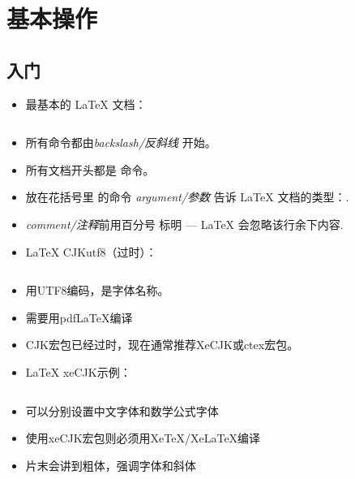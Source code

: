 \documentclass{beamer}
\begin{document}
\section{基本操作}

\subsection{入门}
\begin{frame}[fragile]{\insertsubsection}
\begin{itemize}
\item 最基本的 \LaTeX{} 文档：
\inputminted[frame=single]{latex}{basics.tex}
\item 所有命令都由\emph{backslash/反斜线} \keystrokebftt{\bs}开始。
\item 所有文档开头都是 命令。
\item 放在花括号里 \keystrokebftt{\{} \keystrokebftt{\}} 的命令 \emph{argument/参数} 告诉 \LaTeX{} 文档的类型：.
\item \emph{comment/注释}前用百分号 \keystrokebftt{\%} 标明 --- \LaTeX{}
会忽略该行余下内容.
\end{itemize}
\end{frame}

\begin{frame}[fragile]{\insertsubsection}
\begin{itemize}
\item \LaTeX{} CJKutf8（过时）：
\inputminted[frame=single]{latex}{basics-zh-cn.tex}
\item {}用UTF8编码，是字体名称。
\item 需要用pdfLaTeX编译
\item CJK宏包已经过时，现在通常推荐XeCJK或ctex宏包。
\end{itemize} 
\end{frame}

\begin{frame}[fragile]{\insertsubsection}
\begin{itemize}
\item \LaTeX{} xeCJK示例：
\inputminted[frame=single]{latex}{basics-zh-cn1.tex}
\item 可以分别设置中文字体和数学公式字体
\item 使用xeCJK宏包则必须用XeTeX/XeLaTeX编译
\item 片末会讲到粗体，强调字体和斜体
\end{itemize}
\end{frame}
\end{document}
